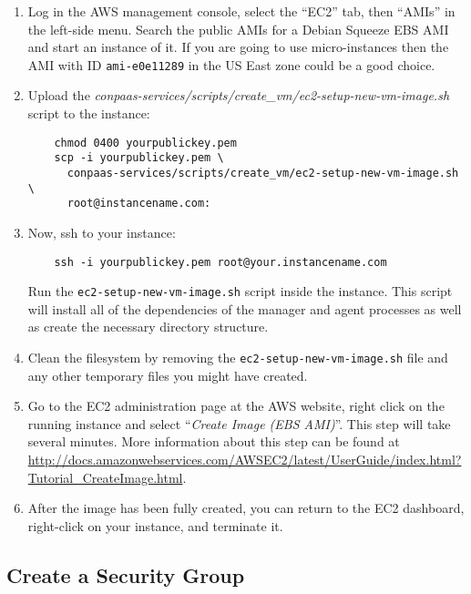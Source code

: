 \documentclass[10pt]{article}
\begin{document}
\begin{enumerate}
\item Log in the AWS management console, select the ``EC2'' tab, then ``AMIs''
in the left-side menu. Search the public AMIs for a Debian Squeeze EBS AMI and
start an instance of it. If you are going to use micro-instances then the AMI
with ID \verb+ami-e0e11289+ in the US East zone could be a good choice.

\item Upload the \textit{conpaas-services/scripts/create\_vm/ec2-setup-new-vm-image.sh} script to the instance:
  \begin{verbatim}
    chmod 0400 yourpublickey.pem
    scp -i yourpublickey.pem \
      conpaas-services/scripts/create_vm/ec2-setup-new-vm-image.sh \
      root@instancename.com:
  \end{verbatim}

\item Now, ssh to your instance:
  \begin{verbatim}
    ssh -i yourpublickey.pem root@your.instancename.com
  \end{verbatim}
  Run the \verb+ec2-setup-new-vm-image.sh+ script inside the instance.
  This script will install all of the dependencies of the manager and
  agent processes as well as create the necessary directory structure.

\item Clean the filesystem by removing the
  \verb+ec2-setup-new-vm-image.sh+ file and any other temporary files you might
  have created.

\item Go to the EC2 administration page at the AWS website, right
  click on the running instance and select ``\emph{Create Image (EBS
    AMI)}''.  This step will take several minutes. More information about this step
 can be found at
  \url{http://docs.amazonwebservices.com/AWSEC2/latest/UserGuide/index.html?Tutorial\_CreateImage.html}.

\item After the image has been fully created, you can return to the
  EC2 dashboard, right-click on your instance, and terminate it.
\end{enumerate}

\subsection{Create a Security Group}
\label{sec:secgroup}
\end{document}
